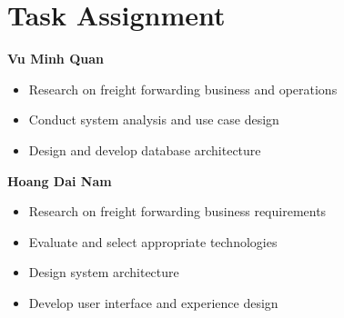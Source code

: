 \chapter{Task Assignment}

\textbf{Vu Minh Quan}
\begin{itemize}
\item Research on freight forwarding business and operations
\item Conduct system analysis and use case design
\item Design and develop database architecture
\end{itemize}

\textbf{Hoang Dai Nam}
\begin{itemize}
\item Research on freight forwarding business requirements
\item Evaluate and select appropriate technologies
\item Design system architecture
\item Develop user interface and experience design
\end{itemize}